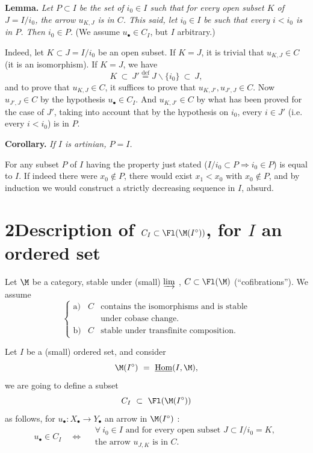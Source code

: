 

\textbf{Lemma.} \textit{Let $P \subset I$ be the set of $i_0 \in I$ such that for every open subset $K$ of $J = I/i_0$, the arrow $u_{K,J}$ is in $C$. This said, let $i_0 \in I$ be such that every $i < i_0$ is in $P$. Then $i_0 \in P$.} (We assume $u_\bullet \in C_I$, but $I$ arbitrary.)

Indeed, let $K \subset J = I/i_0$ be an open subset. If $K = J$, it is trivial that $u_{K,J} \in C$ (it is an isomorphism). If $K = J$, we have %
\[
K \ \subset\ J' \overset{\text{def}}{=} J\backslash\{i_0\} \ \subset\ J,
\]
and to prove that $u_{K,J} \in C$, it suffices to prove that $u_{K,J'}, u_{J',J} \in C$. Now $u_{J',J} \in C$ by the hypothesis $u_\bullet \in C_I$. And $u_{K,J'} \in C$ by what has been proved for the case of $J'$, taking into account that by the hypothesis on $i_0$, every $i \in J'$ (i.e. every $i < i_0$) is in $P$. %

\textbf{Corollary.} \textit{If $I$ is artinian, $P = I$.}

For any subset $P$ of $I$ having the property just stated ($I/i_0 \subset P \Longrightarrow i_0 \in P$) is equal to $I$. If indeed there were $x_0 \notin P$, there would exist $x_1 < x_0$ with $x_0 \notin P$, and by induction we would construct a strictly decreasing sequence in $I$, absurd. %


\section*{2\quad Description of $C_I \subset \Fl(\M(I^\circ))$, for $I$ an ordered set}

Let $\M$ be a category, stable under (small) $\varinjlim$ , $C \subset \Fl(\M)$ (``cofibrations''). We assume
\[
\left\{
\begin{array}{lll}
\text{a)} & C & \text{contains the isomorphisms and is stable}\\
 & & \text{under cobase change.}\\[1ex]
\text{b)} & C & \text{stable under transfinite composition.}
\end{array}
\right.
\tag*{(2.1)}
\]

Let $I$ be a (small) ordered set, and consider
\[
\M(I^\circ) \ =\ \underline{\mathrm{Hom}}(I,\M),
\]
we are going to define a subset
\[
C_I \ \subset\ \Fl(\M(I^\circ))
\]
as follows, for $u_\bullet : X_\bullet \longrightarrow Y_\bullet$ an arrow in $\M(I^\circ)$ :
\[
u_\bullet \in C_I \quad\Longleftrightarrow\quad
\begin{array}{l}
\forall\ i_0 \in I \text{ and for every open subset } J \subset I/i_0 = K,\\
\text{the arrow } u_{J,K} \text{ is in } C.
\end{array}
\tag*{(2.2)}
\]

